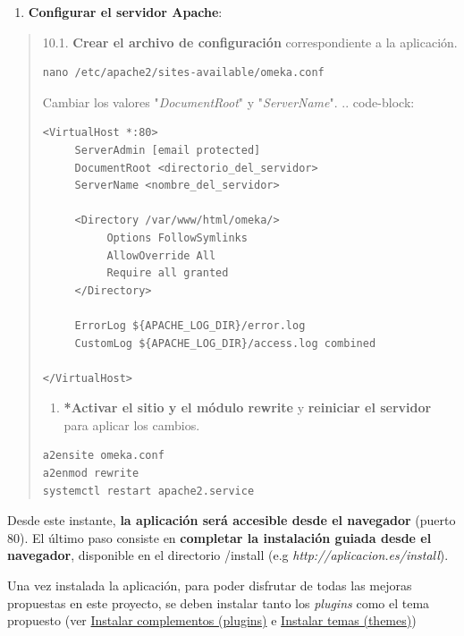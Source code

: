 \documentclass[
]{article}
\providecommand{\tightlist}{%
  \setlength{\itemsep}{0pt}\setlength{\parskip}{0pt}}
\begin{document}
\begin{enumerate}
\def\labelenumi{\arabic{enumi}.}
\setcounter{enumi}{9}
\tightlist
\item
  \textbf{Configurar el servidor Apache}:
\end{enumerate}

\begin{quote}
10.1. \textbf{Crear el archivo de configuración} correspondiente a la
aplicación.

\begin{verbatim}
nano /etc/apache2/sites-available/omeka.conf
\end{verbatim}

Cambiar los valores "\emph{DocumentRoot}" y "\emph{ServerName}". ..
code-block:

\begin{verbatim}
<VirtualHost *:80>
     ServerAdmin [email protected]
     DocumentRoot <directorio_del_servidor>
     ServerName <nombre_del_servidor>

     <Directory /var/www/html/omeka/>
          Options FollowSymlinks
          AllowOverride All
          Require all granted
     </Directory>

     ErrorLog ${APACHE_LOG_DIR}/error.log
     CustomLog ${APACHE_LOG_DIR}/access.log combined

</VirtualHost>
\end{verbatim}

\begin{enumerate}
\def\labelenumi{\alph{enumi}.}
\setcounter{enumi}{1}
\tightlist
\item
  \textbf{*Activar el sitio y el módulo rewrite} y \textbf{reiniciar el
  servidor} para aplicar los cambios.
\end{enumerate}

\begin{verbatim}
a2ensite omeka.conf
a2enmod rewrite
systemctl restart apache2.service
\end{verbatim}
\end{quote}

Desde este instante, \textbf{la aplicación será accesible desde el
navegador} (puerto 80). El último paso consiste en \textbf{completar la
instalación guiada desde el navegador}, disponible en el directorio
{/install} (e.g \emph{http://aplicacion.es/install}).

Una vez instalada la aplicación, para poder disfrutar de todas las
mejoras propuestas en este proyecto, se deben instalar tanto los
\emph{plugins} como el tema propuesto (ver
\protect\hyperlink{instalar-complementos-plugins}{Instalar complementos
(plugins)} e \protect\hyperlink{instalar-temas-themes}{Instalar temas
(themes)})
\end{document}
